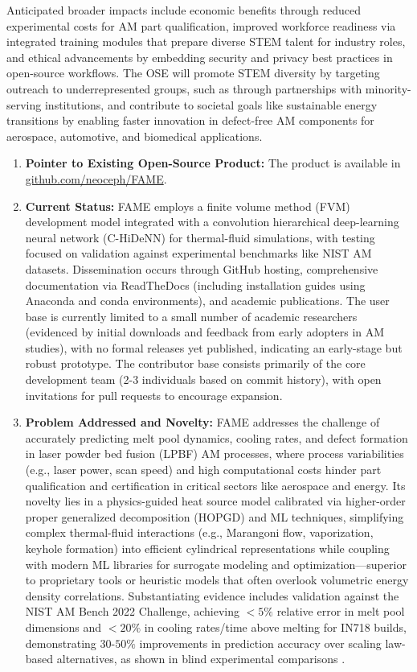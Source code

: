\documentclass[11pt]{article}
\begin{document}
Anticipated broader impacts include economic benefits through reduced experimental costs for AM part qualification, improved workforce readiness via integrated training modules that prepare diverse STEM talent for industry roles, and ethical advancements by embedding security and privacy best practices in open-source workflows. The OSE will promote STEM diversity by targeting outreach to underrepresented groups, such as through partnerships with minority-serving institutions, and contribute to societal goals like sustainable energy transitions by enabling faster innovation in defect-free AM components for aerospace, automotive, and biomedical applications.
\vspace{-3pt}

\begin{enumerate}
    \item \textbf{Pointer to Existing Open-Source Product:} The product is available in \url{github.com/neoceph/FAME}.
    \vspace{-3pt}
    \item \textbf{Current Status:} FAME employs a finite volume method (FVM) development model integrated with a convolution hierarchical deep-learning neural network (C-HiDeNN) for thermal-fluid simulations, with testing focused on validation against experimental benchmarks like NIST AM datasets. Dissemination occurs through GitHub hosting, comprehensive documentation via ReadTheDocs (including installation guides using Anaconda and conda environments), and academic publications. The user base is currently limited to a small number of academic researchers (evidenced by initial downloads and feedback from early adopters in AM studies), with no formal releases yet published, indicating an early-stage but robust prototype. The contributor base consists primarily of the core development team (2-3 individuals based on commit history), with open invitations for pull requests to encourage expansion.
    \vspace{-3pt}
    \item \textbf{Problem Addressed and Novelty:} FAME addresses the challenge of accurately predicting melt pool dynamics, cooling rates, and defect formation in laser powder bed fusion (LPBF) AM processes, where process variabilities (e.g., laser power, scan speed) and high computational costs hinder part qualification and certification in critical sectors like aerospace and energy. Its novelty lies in a physics-guided heat source model calibrated via higher-order proper generalized decomposition (HOPGD) and ML techniques, simplifying complex thermal-fluid interactions (e.g., Marangoni flow, vaporization, keyhole formation) into efficient cylindrical representations while coupling with modern ML libraries for surrogate modeling and optimization—superior to proprietary tools or heuristic models that often overlook volumetric energy density correlations. Substantiating evidence includes validation against the NIST AM Bench 2022 Challenge, achieving $<5\%$ relative error in melt pool dimensions and $<20\%$ in cooling rates/time above melting for IN718 builds, demonstrating $30\text{-}50\%$ improvements in prediction accuracy over scaling law-based alternatives, as shown in blind experimental comparisons \cite{aminPhysicsGuidedHeat2024}.

\end{enumerate}
\end{document}
